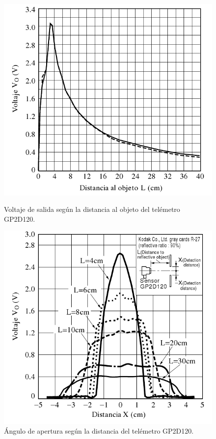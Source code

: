 \begin{figure}[ht]
	\begin{minipage}[b]{0.5\linewidth}
		\centering
		\includegraphics[scale=0.25]{tel-VxL.png}
		\caption{Voltaje de salida seg\'un la distancia al objeto del tel\'emetro GP2D120.}
		\label{hF_gp2d120_distancia}
	\end{minipage}
	\begin{minipage}[b]{0.5\linewidth}
		\centering
		\includegraphics[scale=0.25]{tel-VxX.png}
		\caption{\'Angulo de apertura seg\'un la distancia del tel\'emetro GP2D120.}
		\label{hF_gp2d120_apertura}
	\end{minipage}
\end{figure}

